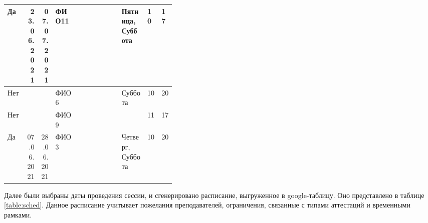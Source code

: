 \begin{table}[htbp]
\begin{tabular}{|p{0.05\linewidth}|p{0.02\linewidth}|p{0.02\linewidth}|p{0.07\linewidth}|p{0.07\linewidth}|p{0.02\linewidth}|p{0.02\linewidth}|p{0.08\linewidth}|p{0.02\linewidth}|p{0.02\linewidth}|}
		Да           & \multicolumn{1}{r|}{23.06.2021} & \multicolumn{1}{r|}{07.07.2021} & ФИО11 &                           &                                 &                                 & Пятница, Суббота & 10                        & 17                        \\ \hline
		Нет          &                                 &                                 & ФИО6  &                           &                                 &                                 & Суббота                       & 10                        & 20                        \\ \hline
		Нет          &                                 &                                 & ФИО9  &                           &                                 &                                 &                               & 11                        & 17                        \\ \hline
		Да           & \multicolumn{1}{r|}{07.06.2021} & \multicolumn{1}{r|}{28.06.2021} & ФИО3  &                           &                                 &                                 & Четверг, Суббота              & 10                        & 20                        \\ \hline
	\end{tabular}
\end{table} 	\label{table:wishes}
\FloatBarrier

Далее были выбраны даты проведения сессии, и сгенерировано расписание, выгруженное в google-таблицу. Оно представлено в таблице \ref{table:sched}. Данное расписание учитывает пожелания преподавателей, ограничения, связанные с типами аттестаций и временными рамками.

